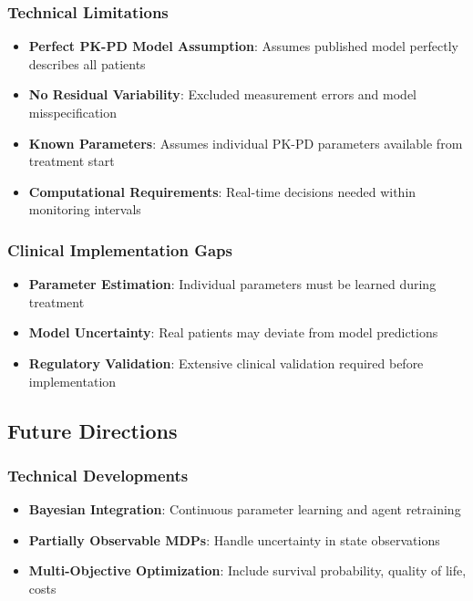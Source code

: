 \subsubsection{Technical Limitations}
\begin{itemize}
    \item \textbf{Perfect PK-PD Model Assumption}: Assumes published model perfectly describes all patients
    \item \textbf{No Residual Variability}: Excluded measurement errors and model misspecification
    \item \textbf{Known Parameters}: Assumes individual PK-PD parameters available from treatment start
    \item \textbf{Computational Requirements}: Real-time decisions needed within monitoring intervals
\end{itemize}

\subsubsection{Clinical Implementation Gaps}
\begin{itemize}
    \item \textbf{Parameter Estimation}: Individual parameters must be learned during treatment
    \item \textbf{Model Uncertainty}: Real patients may deviate from model predictions
    \item \textbf{Regulatory Validation}: Extensive clinical validation required before implementation
\end{itemize}

\subsection{Future Directions}

\subsubsection{Technical Developments}
\begin{itemize}
    \item \textbf{Bayesian Integration}: Continuous parameter learning and agent retraining
    \item \textbf{Partially Observable MDPs}: Handle uncertainty in state observations
    \item \textbf{Multi-Objective Optimization}: Include survival probability, quality of life, costs
\end{itemize}

